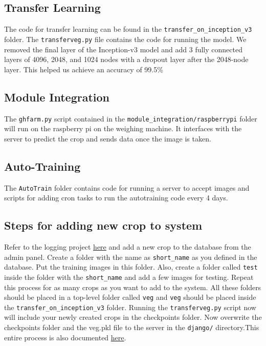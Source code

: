 \documentclass[a4paper,12pt,oneside]{book}
\begin{document}
\subsection{Transfer Learning}
The code for transfer learning can be found in the \texttt{transfer\_on\_inception\_v3} folder. The \texttt{transferveg.py} file contains the code for running the model.
We removed the final layer of the Inception-v3 model and add 3 fully connected layers of 4096, 2048, and 1024 nodes with a dropout layer after the 2048-node layer.
This helped us achieve an accuracy of 99.5\%

\subsection{Module Integration}
The \texttt{ghfarm.py} script contained in the \texttt{module\_integration/raspberrypi} folder will run on the raspberry pi on the weighing machine. It interfaces with the server to predict the crop and sends data once the image is taken.

\subsection{Auto-Training}
The \texttt{AutoTrain} folder contains code for running a server to accept images and scripts for adding cron tasks to run the autotraining code every 4 days.

\subsection{Steps for adding new crop to system}
Refer to the logging project \href{https://github.com/eYSIP-2017/eYSIP-2017_Development_of_Web_Interface_for_GH_Farm_Produce}{here} and add a new crop to the database from the admin panel. Create a folder with the name as \texttt{short\_name} as you defined in the database. Put the training images in this folder. Also, create a folder called \texttt{test} inside the folder with the \texttt{short\_name} and add a few images for testing. Repeat this process for as many crops as you want to add to the system. All these folders should be placed in a top-level folder called \texttt{veg} and \texttt{veg} should be placed inside the \texttt{transfer\_on\_inception\_v3} folder. Running the \texttt{transferveg.py} script now will include your newly created crops in the checkpoints folder.
Now overwrite the checkpoints folder and the veg.pkl file to the server in the \texttt{django/} directory.This entire process is also documented \href{https://github.com/eYSIP-2017/eYSIP-2017_Vegetable-Identification-Using-Transfer-Learning/wiki/Transfer-Learning}{here}.
\end{document}
